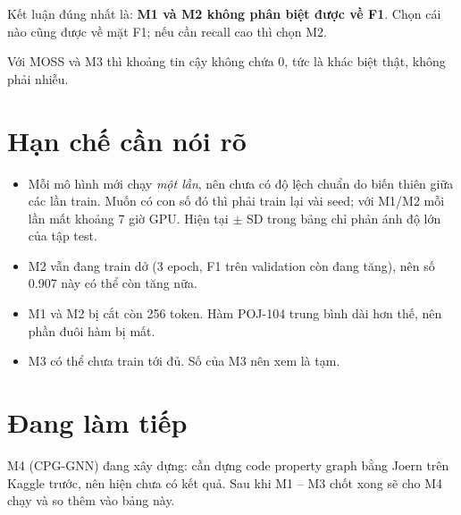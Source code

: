 \documentclass[11pt,a4paper]{article}
\begin{document}
Kết luận đúng nhất là: \textbf{M1 và M2 không phân biệt được về F1}. Chọn cái nào
cũng được về mặt F1; nếu cần recall cao thì chọn M2.

Với MOSS và M3 thì khoảng tin cậy không chứa 0, tức là khác biệt thật, không phải
nhiễu.

\section{Hạn chế cần nói rõ}

\begin{itemize}[leftmargin=1.3em, itemsep=2pt]
    \item Mỗi mô hình mới chạy \emph{một lần}, nên chưa có độ lệch chuẩn do biến
          thiên giữa các lần train. Muốn có con số đó thì phải train lại vài seed;
          với M1/M2 mỗi lần mất khoảng 7 giờ GPU. Hiện tại $\pm$ SD trong bảng chỉ
          phản ánh độ lớn của tập test.
    \item M2 vẫn đang train dở (3 epoch, F1 trên validation còn đang tăng), nên số
          0.907 này có thể còn tăng nữa.
    \item M1 và M2 bị cắt còn 256 token. Hàm POJ-104 trung bình dài hơn thế, nên
          phần đuôi hàm bị mất.
    \item M3 có thể chưa train tới đủ. Số của M3 nên xem là tạm.
\end{itemize}

\section{Đang làm tiếp}

M4 (CPG-GNN) đang xây dựng: cần dựng code property graph bằng Joern trên Kaggle
trước, nên hiện chưa có kết quả. Sau khi M1 -- M3 chốt xong sẽ cho M4 chạy và so
thêm vào bảng này.
\end{document}
